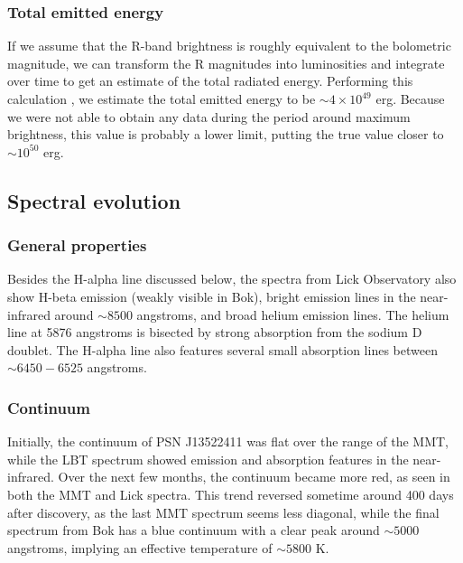 \documentclass[iop]{emulateapj}
\begin{document}
\subsubsection{Total emitted energy}
If we assume that the R-band brightness is roughly equivalent to the bolometric magnitude, we can transform the R magnitudes into luminosities and integrate over time to get an estimate of the total radiated energy. Performing this calculation \citep{Are99}, we estimate the total emitted energy to be $\sim4 \times 10^{49}$ erg. Because we were not able to obtain any data during the period around maximum brightness, this value is probably a lower limit, putting the true value closer to $\sim10^{50}$ erg.

\subsection{Spectral evolution}
\subsubsection{General properties}
Besides the H-alpha line discussed below, the spectra from Lick Observatory also show H-beta emission (weakly visible in Bok), bright emission lines in the near-infrared around $\sim8500$ angstroms, and broad helium emission lines. The helium line at 5876 angstroms is bisected by strong absorption from the sodium D doublet. The H-alpha line also features several small absorption lines between $\sim6450-6525$ angstroms.

\subsubsection{Continuum}
Initially, the continuum of PSN J13522411 was flat over the range of the MMT, while the LBT spectrum showed emission and absorption features in the near-infrared. Over the next few months, the continuum became more red, as seen in both the MMT and Lick spectra. This trend reversed sometime around 400 days after discovery, as the last MMT spectrum seems less diagonal, while the final spectrum from Bok has a blue continuum with a clear peak around $\sim5000$ angstroms, implying an effective temperature of $\sim5800$ K.
\end{document}
